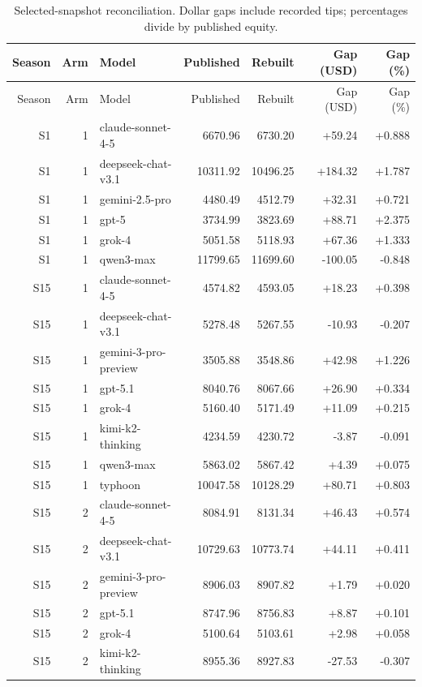 \begin{longtable}{rrlrrrr}
\caption{Selected-snapshot reconciliation. Dollar gaps include recorded tips; percentages divide by published equity.}\label{tab:reconciliation}\\
\toprule Season & Arm & Model & Published & Rebuilt & Gap (USD) & Gap (\%)\\
\midrule\endfirsthead
\toprule Season & Arm & Model & Published & Rebuilt & Gap (USD) & Gap (\%)\\\midrule\endhead
S1 & 1 & claude-sonnet-4-5 & 6670.96 & 6730.20 & +59.24 & +0.888 \\
S1 & 1 & deepseek-chat-v3.1 & 10311.92 & 10496.25 & +184.32 & +1.787 \\
S1 & 1 & gemini-2.5-pro & 4480.49 & 4512.79 & +32.31 & +0.721 \\
S1 & 1 & gpt-5 & 3734.99 & 3823.69 & +88.71 & +2.375 \\
S1 & 1 & grok-4 & 5051.58 & 5118.93 & +67.36 & +1.333 \\
S1 & 1 & qwen3-max & 11799.65 & 11699.60 & -100.05 & -0.848 \\
S15 & 1 & claude-sonnet-4-5 & 4574.82 & 4593.05 & +18.23 & +0.398 \\
S15 & 1 & deepseek-chat-v3.1 & 5278.48 & 5267.55 & -10.93 & -0.207 \\
S15 & 1 & gemini-3-pro-preview & 3505.88 & 3548.86 & +42.98 & +1.226 \\
S15 & 1 & gpt-5.1 & 8040.76 & 8067.66 & +26.90 & +0.334 \\
S15 & 1 & grok-4 & 5160.40 & 5171.49 & +11.09 & +0.215 \\
S15 & 1 & kimi-k2-thinking & 4234.59 & 4230.72 & -3.87 & -0.091 \\
S15 & 1 & qwen3-max & 5863.02 & 5867.42 & +4.39 & +0.075 \\
S15 & 1 & typhoon & 10047.58 & 10128.29 & +80.71 & +0.803 \\
S15 & 2 & claude-sonnet-4-5 & 8084.91 & 8131.34 & +46.43 & +0.574 \\
S15 & 2 & deepseek-chat-v3.1 & 10729.63 & 10773.74 & +44.11 & +0.411 \\
S15 & 2 & gemini-3-pro-preview & 8906.03 & 8907.82 & +1.79 & +0.020 \\
S15 & 2 & gpt-5.1 & 8747.96 & 8756.83 & +8.87 & +0.101 \\
S15 & 2 & grok-4 & 5100.64 & 5103.61 & +2.98 & +0.058 \\
S15 & 2 & kimi-k2-thinking & 8955.36 & 8927.83 & -27.53 & -0.307 \\

\end{longtable}
